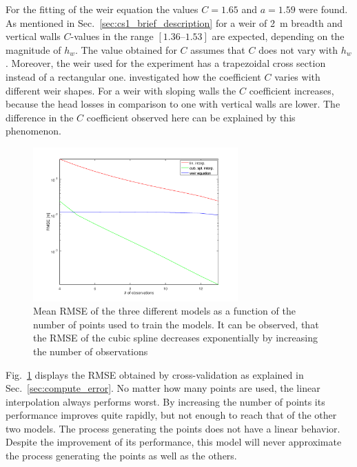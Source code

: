 For the fitting of the weir equation the values $C = 1.65$ and $a = 1.59$ were found.
As mentioned in Sec.~\ref{sec:cs1_brief_description} for a weir of \SI{2}{\m} breadth and vertical walls $C$-values in the range $[\numrange{1.36}{1.53}]$ are expected, depending on the magnitude of $h_w$.
The value obtained for $C$ assumes that $C$ does not vary with $h_w$.
Moreover, the weir used for the experiment has a trapezoidal cross section instead of a rectangular one.
\cite{tracy_discharge_1957} investigated how the coefficient $C$ varies with different weir shapes.
For a weir with sloping walls the $C$ coefficient increases, because the head losses in comparison to one with vertical walls are lower.
The difference in the $C$ coefficient observed here can be explained by this phenomenon.\\

\begin{figure}[h]
  \centering
  \includegraphics[width=0.7\textwidth]{Figures/fitting_errors.png}
  \caption{Mean RMSE of the three different models as a function of the number of points used to train the models. It can be observed, that the RMSE of the cubic spline decreases exponentially by increasing the number of observations}
  \label{fig:fitting_errors}
\end{figure}

Fig.~\ref{fig:fitting_errors} displays the RMSE obtained by cross-validation as explained in Sec.~\ref{sec:compute_error}.
No matter how many points are used, the linear interpolation always performs worst.
By increasing the number of points its performance improves quite rapidly, but not enough to reach that of the other two models.
The process generating the points does not have a linear behavior.
Despite the improvement of its performance, this model will never approximate the process generating the points as well as the others.

